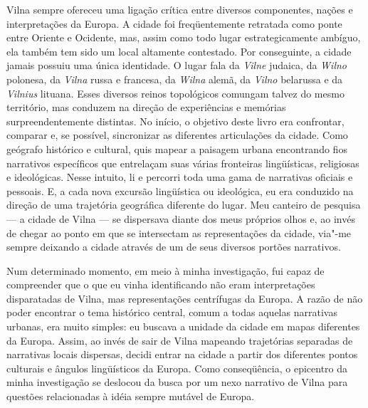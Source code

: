 Vilna sempre ofereceu uma ligação crítica entre diversos componentes,
nações e interpretações da Europa. A cidade foi freqüentemente retratada
como ponte entre Oriente e Ocidente, mas, assim como todo lugar
estrategicamente ambíguo, ela também tem sido um local altamente
contestado. Por conseguinte, a cidade jamais possuiu uma única
identidade. O lugar fala da \emph{Vilne} judaica, da \emph{Wilno}
polonesa, da \emph{Vilna} russa e francesa, da \emph{Wilna} alemã, da
\emph{Vilno} belarussa e da \emph{Vilnius} lituana. Esses diversos
reinos topológicos comungam talvez do mesmo território, mas conduzem na
direção de experiências e memórias surpreendentemente distintas. No
início, o objetivo deste livro era confrontar, comparar e, se possível,
sincronizar as diferentes articulações da cidade. Como geógrafo
histórico e cultural, quis mapear a paisagem urbana encontrando fios
narrativos específicos que entrelaçam suas várias fronteiras
lingüísticas, religiosas e ideológicas. Nesse intuito, li e percorri
toda uma gama de narrativas oficiais e pessoais. E, a cada nova excursão
lingüística ou ideológica, eu era conduzido na direção de uma trajetória
geográfica diferente do lugar. Meu canteiro de pesquisa --- a cidade de
Vilna --- se dispersava diante dos meus próprios olhos e, ao invés de
chegar ao ponto em que se intersectam as representações da cidade,
via"-me sempre deixando a cidade através de um de seus diversos portões
narrativos.

Num determinado momento, em meio à minha investigação, fui capaz de
compreender que o que eu vinha identificando não eram interpretações
disparatadas de Vilna, mas representações centrífugas da Europa. A razão
de não poder encontrar o tema histórico central, comum a todas aquelas
narrativas urbanas, era muito simples: eu buscava a unidade da cidade em
mapas diferentes da Europa. Assim, ao invés de sair de Vilna mapeando
trajetórias separadas de narrativas locais dispersas, decidi entrar na
cidade a partir dos diferentes pontos culturais e ângulos lingüísticos
da Europa. Como conseqüência, o epicentro da minha investigação se
deslocou da busca por um nexo narrativo de Vilna para questões
relacionadas à idéia sempre mutável de Europa.

%


